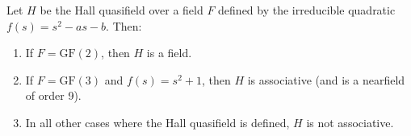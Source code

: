 Let $H$ be the Hall quasifield over a field $F$ defined by the irreducible quadratic $f(s) = s^2 - as - b$. Then:
\begin{enumerate}
\item If $F = \mathrm{GF}(2)$, then $H$ is a field.
\item If $F = \mathrm{GF}(3)$ and $f(s) = s^2 + 1$, then $H$ is associative (and is a nearfield of order 9).
\item In all other cases where the Hall quasifield is defined, $H$ is not associative.
\end{enumerate}